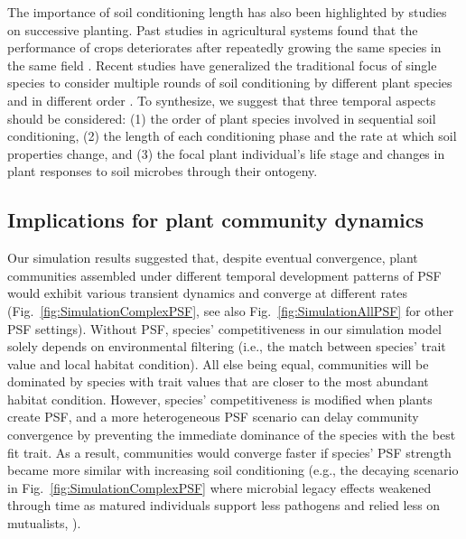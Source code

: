 The importance of soil conditioning length has also been highlighted by studies on successive planting. Past studies in agricultural systems found that the performance of crops deteriorates after repeatedly growing the same species in the same field \citep{Mazzola1999, Packer2004}.
Recent studies have generalized the traditional focus of single species to consider multiple rounds of soil conditioning by different plant species and in different order \citep{Mariotte2018, Wubs2017, Bezemer2018}.
To synthesize, we suggest that three temporal aspects should be considered: (1) the order of plant species involved in sequential soil conditioning, (2) the length of each conditioning phase and the rate at which soil properties change, and (3) the focal plant individual's life stage and changes in plant responses to soil microbes through their ontogeny. 
\par



\subsection*{Implications for plant community dynamics}
Our simulation results suggested that, despite eventual convergence, plant communities assembled under different temporal development patterns of PSF would exhibit various transient dynamics and converge at different rates (Fig.~\ref{fig:SimulationComplexPSF}, see also Fig.~\ref{fig:SimulationAllPSF} for other PSF settings).  
Without PSF, species' competitiveness in our simulation model solely depends on environmental filtering (i.e., the match between species' trait value and local habitat condition). All else being equal, communities will be dominated by species with trait values that are closer to the most abundant habitat condition. However, species' competitiveness is modified when plants create PSF, and a more heterogeneous PSF scenario can delay community convergence by preventing the immediate dominance of the species with the best fit trait. 
As a result, communities would converge faster if species' PSF strength became more similar with increasing soil conditioning (e.g., the decaying scenario in Fig.~\ref{fig:SimulationComplexPSF} where microbial legacy effects weakened through time as matured individuals support less pathogens and relied less on mutualists, \citealp{Reinhart2010b}).
\par


